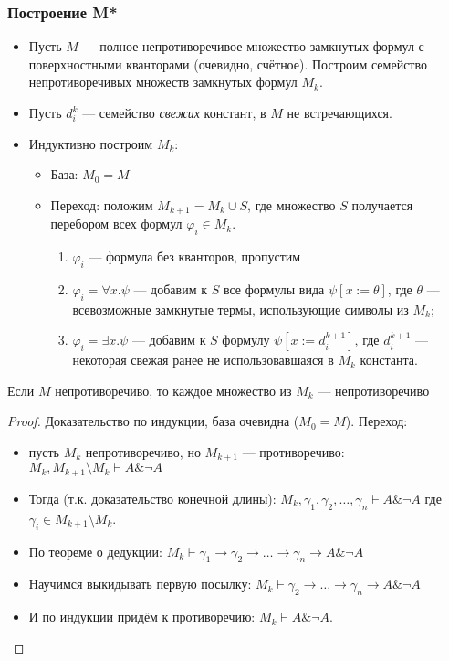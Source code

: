 \subsubsection{Построение M*}
\begin{itemize}
\item Пусть $M$ --- полное непротиворечивое множество замкнутых формул с поверхностными кванторами (очевидно, счётное).
 Построим семейство непротиворечивых множеств замкнутых формул $M_k$.
\item Пусть $d^k_i$ --- семейство \emph{свежих} констант, в $M$ не встречающихся.
\item Индуктивно построим $M_k$:
\begin{itemize}
\item База: $M_0 = M$
\item Переход: положим $M_{k+1} = M_k \cup S$, где множество $S$ получается перебором всех формул $\varphi_i \in M_k$.
\begin{enumerate}
\item $\varphi_i$ --- формула без кванторов, пропустим
\item $\varphi_i = \forall x.\psi$ --- добавим к $S$ все формулы вида $\psi [x := \theta]$, где
$\theta$ --- всевозможные замкнутые термы, использующие символы из $M_k$;
\item $\varphi_i = \exists x.\psi$ --- добавим к $S$ формулу $\psi [x := d^{k+1}_i]$, где $d^{k+1}_i$ --- некоторая
свежая ранее не использовавшаяся в $M_k$ константа.
\end{enumerate}
\end{itemize}
\end{itemize}

\begin{lemma}
    Если $M$ непротиворечиво, то каждое множество из $M_k$ --- непротиворечиво
\end{lemma}
\begin{proof}Доказательство по индукции, база очевидна ($M_0 = M$).
Переход: \begin{itemize}
\item пусть $M_k$ непротиворечиво, но $M_{k+1}$ --- противоречиво: $M_k, M_{k+1}\setminus M_k \vdash A\&\neg A$
\item Тогда (т.к. доказательство конечной длины):
$M_k, \gamma_1, \gamma_2, \dots,\gamma_n\vdash A\&\neg A$
где $\gamma_i \in M_{k+1}\setminus M_k$.
\item По теореме о дедукции: $M_k\vdash \gamma_1\to\gamma_2\to\dots\to\gamma_n\to A\&\neg A$
\item Научимся выкидывать первую посылку: $M_k\vdash \gamma_2\to\dots\to\gamma_n\to A\&\neg A$
\item И по индукции придём к противоречию: $M_k \vdash A\&\neg A$.
\end{itemize}
\end{proof}

